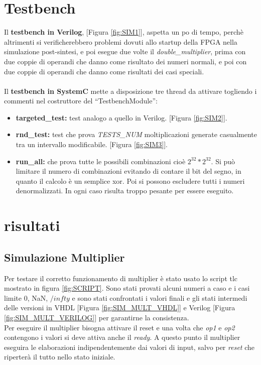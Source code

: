 \documentclass[]{IEEEtran}
\begin{document}
\section{Testbench}
Il \textbf{testbench in Verilog}, [Figura \ref{fig:SIM1}], aspetta un po di tempo, perchè altrimenti si verificherebbero problemi dovuti allo startup della FPGA nella simulazione post-sintesi, e poi esegue due volte il \textit{double\_multiplier}, prima con due coppie di operandi che danno come risultato dei numeri normali, e poi con due coppie di operandi che danno come risultati dei casi speciali. \\\\


Il \textbf{testbench in SystemC} mette a disposizione tre thread da attivare togliendo i commenti nel costruttore del ``TestbenchModule'':
\begin{itemize}
    \item \textbf{targeted\_test:} test analogo a quello in Verilog. [Figura \ref{fig:SIM2}].
    \item \textbf{rnd\_test:} test che prova \textit{TESTS\_NUM} moltiplicazioni generate casualmente tra un intervallo modificabile. [Figura \ref{fig:SIM3}].
    \item \textbf{run\_all:} che prova tutte le possibili combinazioni cioè \(2^{32} * 2^{32}\). Si può limitare il numero di combinazioni evitando di contare il bit del segno, in quanto il calcolo è un semplice xor. Poi si possono escludere tutti i numeri denormalizzati. In ogni caso risulta troppo pesante per essere eseguito.
\end{itemize}



\section{risultati}

\subsection{Simulazione Multiplier}
Per testare il corretto funzionamento di multiplier è stato usato lo script tlc mostrato in figura \ref{fig:SCRIPT}. Sono stati provati alcuni numeri a caso e i casi limite 0, NaN, $/infty$ e sono stati confrontati i valori finali e gli stati intermedi delle versioni in VHDL [Figura \ref{fig:SIM_MULT_VHDL}] e Verilog [Figura \ref{fig:SIM_MULT_VERILOG}] per garantirne la consistenza.
\\Per eseguire il multiplier bisogna attivare il reset e una volta che \textit{op1} e \textit{op2} contengono i valori si deve attiva anche il \textit{ready}. A questo punto il multiplier eseguira le elaborazioni indipendentemente dai valori di input, salvo per \textit{reset} che riperterà il tutto nello stato iniziale.
\end{document}
